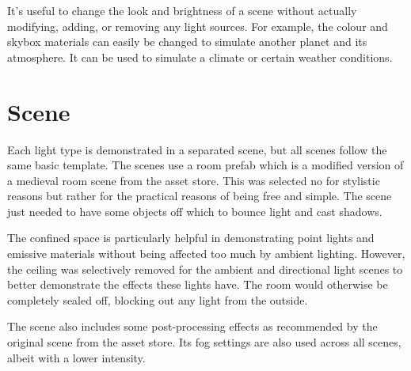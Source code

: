 \documentclass[a4paper, 12pt]{scrartcl}
\begin{document}
It's useful to change the look and brightness of a scene without actually modifying, adding, or removing any light sources. For example, the colour and skybox materials can easily be changed to simulate another planet and its atmosphere. It can be used to simulate a climate or certain weather conditions.

\section{Scene}

Each light type is demonstrated in a separated scene, but all scenes follow the same basic template. The scenes use a room prefab which is a modified version of a medieval room scene from the asset store. This was selected no for stylistic reasons but rather for the practical reasons of being free and simple. The scene just needed to have some objects off which to bounce light and cast shadows.

The confined space is particularly helpful in demonstrating point lights and emissive materials without being affected too much by ambient lighting. However, the ceiling was selectively removed for the ambient and directional light scenes to better demonstrate the effects these lights have. The room would otherwise be completely sealed off, blocking out any light from the outside.

The scene also includes some post-processing effects as recommended by the original scene from the asset store. Its fog settings are also used across all scenes, albeit with a lower intensity.
\end{document}
